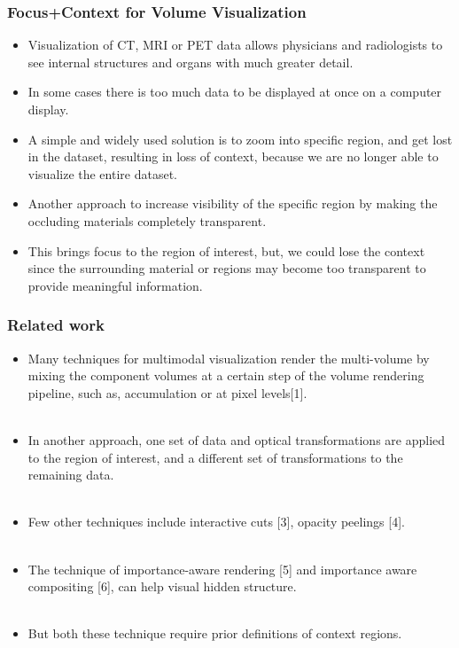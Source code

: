 \documentclass{beamer}
\begin{document}
\begin{frame}
\frametitle{Focus+Context for Volume Visualization}
\begin{itemize}
\item Visualization of CT, MRI or PET data allows physicians and radiologists to see internal structures and organs with much greater detail.
\item In some cases there is too much data to be displayed at once on a computer display.
\item A simple and widely used solution is to zoom into specific region, and get lost in the dataset, resulting in loss of context, because we are no longer able to visualize the entire dataset.
\item Another approach to increase visibility of the specific region by making the occluding materials completely transparent. 
\item This brings focus to the region of interest, but, we could lose the context since the surrounding material or regions may become too transparent to provide meaningful information.
\end{itemize}
\end{frame}



\begin{frame}
\frametitle{Related work}
\begin{itemize}
\item Many techniques for multimodal visualization render the multi-volume by mixing the component volumes at a certain step of the volume rendering pipeline, such as, accumulation or at pixel levels[1]. \\ $ $
\item In another approach, one set of data and optical transformations are applied to the region of interest, and a different set of transformations to the remaining data.\\ $ $
\item Few other techniques include interactive cuts [3], opacity peelings [4]. \\ $ $
\item The technique of importance-aware rendering [5] and importance aware compositing [6], can help visual hidden structure. \\ $ $
\item But both these technique require prior definitions of context regions.
\end{itemize}
\end{frame}
\end{document}
